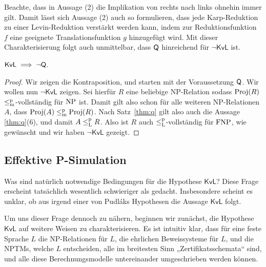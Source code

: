 Beachte, dass in Aussage (2) die Implikation von rechts nach links ohnehin immer gilt. 
Damit lässt sich Aussage (2) auch so formulieren, dass jede Karp-Reduktion zu einer Levin-Reduktion verstärkt werden kann, indem zur Reduktionsfunktion $f$ eine geeignete Translationsfunktion $g$ hinzugefügt wird.
Mit dieser Charakterisierung folgt auch unmittelbar, dass $\mathsf{Q}$ hinreichend für $\neg\mathsf{KvL}$ ist.


\begin{corollary}\label{cor:kvl-implies-q}
    $\mathsf{KvL} \implies \neg\mathsf{Q}$.
\end{corollary}
\begin{proof}
    Wir zeigen die Kontraposition, und starten mit der Voraussetzung $\mathsf{Q}$.
    Wir wollen nun $\neg\mathsf{KvL}$ zeigen. Sei hierfür $R$ eine beliebige NP-Relation sodass $\operatorname{Proj}(R)$ $\leq_\mathrm{m}^\mathrm{p}$-vollständig für $\mathrm{NP}$ ist.
    Damit gilt also schon für alle weiteren NP-Relationen $A$, dass $\operatorname{Proj}(A)\leq_\mathrm{m}^\mathrm{p}\operatorname{Proj}(R)$.
    Nach Satz~\ref{thm:q} gilt also auch die Aussage \ref{thm:q}(6), und damit $A\leq_\mathrm{L}^\mathrm{p} R$. Also ist $R$ auch $\leq_\mathrm{L}^\mathrm{p}$-vollständig für $\mathrm{FNP}$, wie gewünscht und wir haben $\neg\mathsf{KvL}$ gezeigt.
\end{proof}

\subsection*{Effektive P-Simulation}

Was sind natürlich notwendige Bedingungen für die Hypothese $\mathsf{KvL}$? Diese Frage erscheint tatsächlich wesentlich schwieriger als gedacht. Insbesondere scheint es unklar, ob aus irgend einer von Pudláks Hypothesen die Aussage $\mathsf{KvL}$ folgt.

Um uns dieser Frage dennoch zu nähern, beginnen wir zunächst, die Hypothese $\mathsf{KvL}$ auf weitere Weisen zu charakterisieren. Es ist intuitiv klar, dass für eine feste Sprache $L$ die NP-Relationen für $L$, die ehrlichen Beweissysteme für $L$, und die NPTMs, welche $L$ entscheiden, alle im breitesten Sinn „Zertifikatsschemata“ sind, und alle diese Berechnungsmodelle untereinander umgeschrieben werden können.

